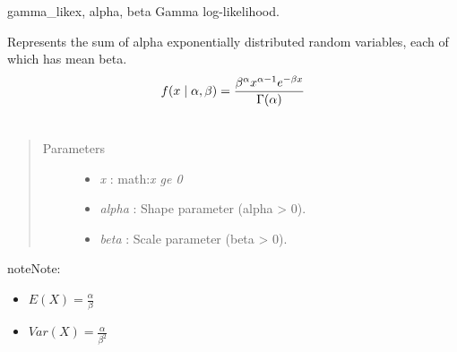\hypertarget{pymc.distributions.gamma_like}{}\begin{funcdesc}{gamma\_like}{x, alpha, beta}
Gamma log-likelihood.

Represents the sum of alpha exponentially distributed random variables, each
of which has mean beta.
\begin{gather}
\begin{split}f(x \mid \alpha, \beta) = \frac{\beta^{\alpha}x^{\alpha-1}e^{-\beta x}}{\Gamma(\alpha)}\end{split}\notag\\\begin{split}\end{split}\notag
\end{gather}\begin{quote}\begin{description}
\item[Parameters] \leavevmode\begin{itemize}
\item {} 
\emph{x} : math:\emph{x ge 0}

\item {} 
\emph{alpha} : Shape parameter (alpha \textgreater{} 0).

\item {} 
\emph{beta} : Scale parameter (beta \textgreater{} 0).

\end{itemize}

\end{description}\end{quote}

\begin{notice}{note}{Note:}\begin{itemize}
\item {} 
$E(X) = \frac{\alpha}{\beta}$

\item {} 
$Var(X) = \frac{\alpha}{\beta^2}$

\end{itemize}
\end{notice}
\end{funcdesc}

